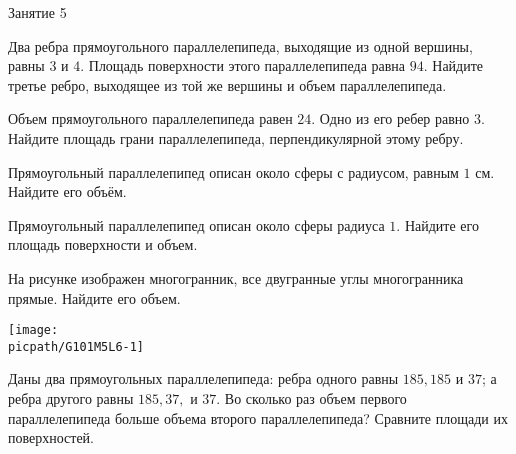 \begin{class}[number=5]
	\begin{listofex}
		\item Занятие 5
	\end{listofex}
\end{class}

\begin{class}[number=6]
	\begin{listofex}
		\item Два ребра прямоугольного параллелепипеда, выходящие из одной вершины, равны \(3\) и \(4\). Площадь поверхности этого параллелепипеда равна \(94\). Найдите третье ребро, выходящее из той же вершины и объем параллелепипеда.
		\item Объем прямоугольного параллелепипеда равен \(24\). Одно из его ребер равно \(3\). Найдите площадь грани параллелепипеда, перпендикулярной этому ребру.
		\item Прямоугольный параллелепипед описан около сферы с радиусом, равным \(1\) см. Найдите его объём.
		\item Прямоугольный параллелепипед описан около сферы радиуса \(1\). Найдите его площадь поверхности и объем.
		\item 
		\begin{minipage}[t]{\bodywidth}
			На рисунке изображен многогранник, все двугранные углы многогранника прямые. Найдите его объем.
		\end{minipage}
		\hspace{0.02\linewidth}
		\begin{minipage}[t]{\picwidth}
			\texttt{[image: \\picpath/G101M5L6-1]}
		\end{minipage}
		\item Даны два прямоугольных параллелепипеда: ребра одного равны \(185 , 185\) и \(37\); а ребра другого равны \(185 , 37,\) и \(37\). Во сколько раз объем первого параллелепипеда больше объема второго параллелепипеда? Сравните площади их поверхностей.

\end{listofex}
\end{class}
